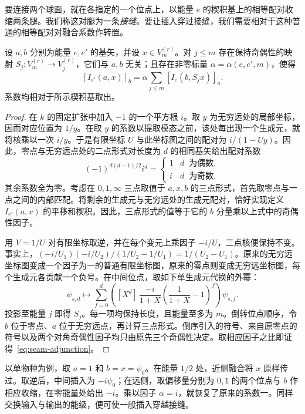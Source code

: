 要连接两个球面，就在各指定的一个位点上，以能量 \(e\) 的楔积基上的相等配对收缩两条腿。我们称这对腿为一条\emph{接缝}。要让插入穿过接缝，我们需要相对于这种普通的相等配对对融合系数作转置。

\begin{lemma}[接缝处的转置]\label{lem:seam} 设 \(a,b\) 分别为能量 \(e,e'\) 的基矢，并设 \(x\in V_m^{(r)}\)。对 \(j\le m\) 存在保持奇偶性的映射 \(S_j:V_m^{(r)}\to V_j^{(r)}\)，它们与 \(a,b\) 无关；且存在非零标量 \(\alpha=\alpha(e,e',m)\)，使得
\begin{equation}\label{eq:seam-adjunction}
 [I_{e'}(a,x)]_b
    =\alpha\sum_{j\le m}[I_e(b,S_jx)]_a .
\end{equation} 系数均相对于所示楔积基取出。\end{lemma}
\begin{proof} 在 \(k\) 的固定扩张中加入 \(-1\) 的一个平方根 \(i\)。取 \(y\) 为无穷远处的局部坐标，因而对应位置为 \(1/y\)。在取 \(y\) 的系数以提取模态之前，该处每出现一个生成元，就将核乘以一次 \(i/y\)。于是有限坐标 \(U\) 与此坐标图之间的配对为 \(i/(1-Uy)\)。因此，零点与无穷远点处的二点形式对长度为 \(d\) 的相同基矢给出配对系数 \[
      (-1)^{d(d-1)/2}i^d=
\begin{cases}1& d\ \text{ 为偶数},\\ i& d\ \text{ 为奇数},\end{cases}
\] 其余系数全为零。考虑在 \(0,1,\infty\) 三点取值于 \(a,x,b\) 的三点形式，首先取零点与一点之间的内部匹配。将剩余的生成元与无穷远处的生成元配对，恰好实现定义 \(I_{e'}(a,x)\) 的平移和楔积。因此，三点形式的值等于它的 \(b\) 分量乘以上式中的奇偶性因子。

用 \(V=1/U\) 对有限坐标取逆，并在每个变元上乘因子 \(-i/U\)，二点核便保持不变。事实上，\((-i/U_1)(-i/U_2)/(1/U_2-1/U_1)=1/(U_2-U_1)\)。原来的无穷远坐标图变成一个因子为一的普通有限坐标图，原来的零点则变成无穷远坐标图，每个生成元各贡献一个负号。在中间位点，取如下单生成元代换的外幂：\[
 \psi_{s,d}\longmapsto
 \sum_{f=0}^{d}
 \left([X^d]\,\frac{-i}{1+X}
       \left(\frac{1}{1+X}-1\right)^{\!f}\right)\psi_{s,f}.
\] 投影至能量 \(j\) 即得 \(S_j\)。每一项均保持长度，且能量至多为 \(m\)。倒转位点顺序，令 \(b\) 位于零点、\(a\) 位于无穷远点，再计算三点形式。倒序引入的符号、来自原零点的符号以及两个对角奇偶性因子均只由原先三个奇偶性决定。取相应因子之比即证得~\eqref{eq:seam-adjunction}。\end{proof}

以单物种为例，取 \(a=1\) 和 \(b=x=\psi_0\)。在能量 \(1/2\) 处，近侧融合将 \(x\) 原样传过。取逆后，中间插入为 \(-i\psi_0\)；在远侧，取偏移量分别为 \(0,1\) 的两个位点与 \(b\) 作相应收缩，在零能量处给出 \(-i\)。乘以因子 \(\alpha=i\)，就恢复了原来的系数一。同样交换输入与输出的能级，便可使一般插入穿越接缝。

